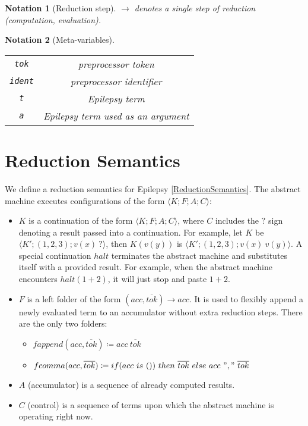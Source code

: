 \documentclass[12pt]{article}
\theoremstyle{break}
\newtheorem{notation}{Notation}
\begin{document}
\begin{notation}[Reduction step]
    $\to$ denotes a single step of reduction (computation, evaluation).
\end{notation}

\begin{notation}[Meta-variables]
    \ \\
    \begin{tabular}{|c|c|}
        \hline
        \texttt{tok} & preprocessor token \\
        \texttt{ident} & preprocessor identifier \\
        \texttt{t} & Epilepsy term \\
        \texttt{a} & Epilepsy term used as an argument \\
        \hline
    \end{tabular}
\end{notation}

\section{Reduction Semantics}

We define a reduction semantics for Epilepsy \ref{ReductionSemantics}. The abstract
machine executes configurations of the form $\langle K; F; A; C \rangle$:

\begin{itemize}
    \item $K$ is a continuation of the form $\langle K; F; A; C \rangle$, where
    $C$ includes the $?$ sign denoting a result passed into a continuation.
    For example, let $K$ be $\langle K'; (1, 2, 3); v(x) \ ? \rangle$,
    then $K(v(y))$ is $\langle K'; (1, 2, 3); v(x) \ v(y) \rangle$. A special
    continuation $halt$ terminates the abstract machine and substitutes itself
    with a provided result. For example, when the abstract machine encounters
    $halt(1 + 2)$, it will just stop and paste $1 + 2$.

    \item $F$ is a left folder of the form $(acc, \overline{tok}) \to acc$. It is used
    to flexibly append a newly evaluated term to an accumulator without extra reduction
    steps. There are the only two folders:
    \begin{itemize}
        \item $fappend(acc, \overline{tok}) \coloneqq acc \ \overline{tok}$
        \item $fcomma(acc, \overline{tok}) \coloneqq if (acc \ is \ ()) \ then \ \overline{tok} \ else \ acc \ "," \ \overline{tok}$
    \end{itemize}

    \item $A$ (accumulator) is a sequence of already computed results.

    \item $C$ (control) is a sequence of terms upon which the abstract
    machine is operating right now.
\end{itemize}
\end{document}
